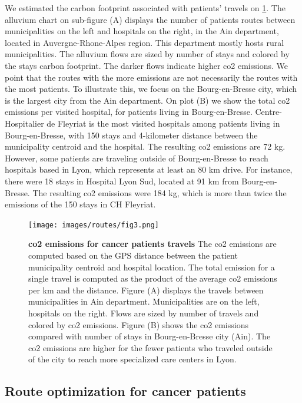 We estimated the carbon footprint associated with patients' travels on
\cref{fig:routes-co2-emissions}. The alluvium chart on
sub-figure (A) displays the number of patients routes between municipalities on
the left and hospitals on the right, in the Ain department, located in
Auvergne-Rhone-Alpes region. This department mostly hosts rural municipalities.
The alluvium flows are sized by number of stays and colored by the stays carbon
footprint. The darker flows indicate higher \ac{co2} emissions. We point that
the routes with the more emissions are not necessarily the routes with the most
patients. To illustrate this, we focus on the Bourg-en-Bresse city, which is the
largest city from the Ain department. On plot (B) we show the total \ac{co2}
emissions per visited hospital, for patients living in Bourg-en-Bresse.
Centre-Hospitalier de Fleyriat is the most visited hospitals among patients
living in Bourg-en-Bresse, with 150 stays and 4-kilometer distance between the
municipality centroid and the hospital. The resulting \ac{co2} emissions are 72
kg. However, some patients are traveling outside of Bourg-en-Bresse to reach
hospitals based in Lyon, which represents at least an 80 km drive. For instance,
there were 18 stays in Hospital Lyon Sud, located at 91 km from Bourg-en-Bresse.
The resulting \ac{co2} emissions were 184 kg, which is more than twice the
emissions of the 150 stays in CH Fleyriat.

\begin{figure}[h!]
    \texttt{[image: images/routes/fig3.png]}
    \centering
    \caption{ \textbf{\ac{co2} emissions for cancer patients travels} The
        \ac{co2} emissions are computed based on the GPS distance between the
        patient municipality centroid and hospital location. The total emission
        for a single travel is computed as the product of the average \ac{co2}
        emissions per km and the distance. Figure (A) displays the travels
        between municipalities in Ain department. Municipalities are on the
        left, hospitals on the right. Flows are sized by number of travels and
        colored by \ac{co2} emissions. Figure (B) shows the \ac{co2} emissions
        compared with number of stays in Bourg-en-Bresse city (Ain). The
        \ac{co2} emissions are higher for the fewer patients who traveled
        outside of the city to reach more specialized care centers in Lyon. }
    \label{fig:routes-co2-emissions}
\end{figure}

\subsection{Route optimization for cancer patients}

